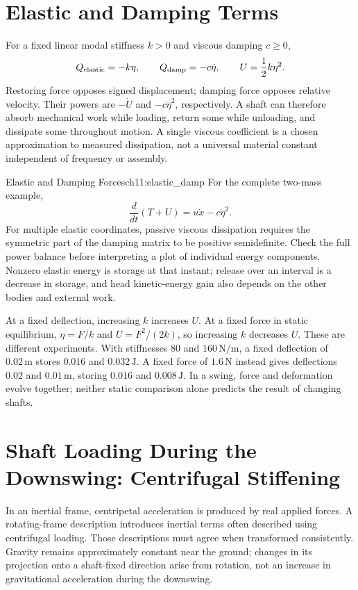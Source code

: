 \section{Elastic and Damping Terms}
For a fixed linear modal stiffness $k>0$ and viscous damping $c\geq0$,
\[
Q_{\rm elastic}=-k\eta,\qquad Q_{\rm damp}=-c\dot\eta,
\qquad U=\frac12k\eta^2.
\]
Restoring force opposes signed displacement; damping force opposes relative velocity. Their powers are $-\dot U$ and $-c\dot\eta^2$, respectively. A shaft can therefore absorb mechanical work while loading, return some while unloading, and dissipate some throughout motion. A single viscous coefficient is a chosen approximation to measured dissipation, not a universal material constant independent of frequency or assembly.

\begin{principle}{Elastic and Damping Forces}{ch11:elastic_damp}
For the complete two-mass example,
\[
\frac{d}{dt}(T+U)=u\dot x-c\dot\eta^2.
\]
For multiple elastic coordinates, passive viscous dissipation requires the symmetric part of the damping matrix to be positive semidefinite. Check the full power balance before interpreting a plot of individual energy components. Nonzero elastic energy is storage at that instant; release over an interval is a decrease in storage, and head kinetic-energy gain also depends on the other bodies and external work.
\end{principle}

At a fixed deflection, increasing $k$ increases $U$. At a fixed force in static equilibrium, $\eta=F/k$ and $U=F^2/(2k)$, so increasing $k$ decreases $U$. These are different experiments. With stiffnesses $80$ and $160\,\mathrm{N/m}$, a fixed deflection of $0.02\,\mathrm m$ stores $0.016$ and $0.032\,\mathrm J$. A fixed force of $1.6\,\mathrm N$ instead gives deflections $0.02$ and $0.01\,\mathrm m$, storing $0.016$ and $0.008\,\mathrm J$. In a swing, force and deformation evolve together; neither static comparison alone predicts the result of changing shafts.

\section{Shaft Loading During the Downswing: Centrifugal Stiffening}
In an inertial frame, centripetal acceleration is produced by real applied forces. A rotating-frame description introduces inertial terms often described using centrifugal loading. Those descriptions must agree when transformed consistently. Gravity remains approximately constant near the ground; changes in its projection onto a shaft-fixed direction arise from rotation, not an increase in gravitational acceleration during the downswing.

